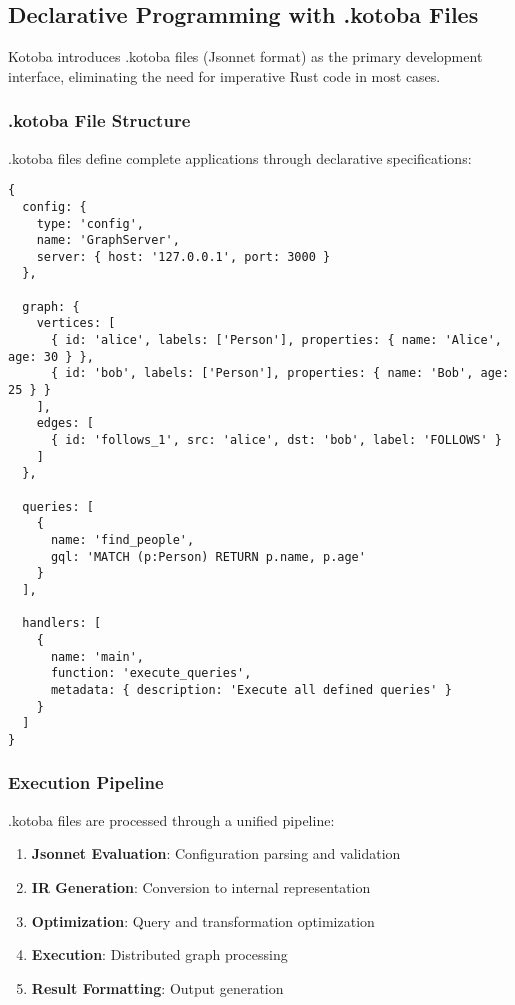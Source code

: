 \documentclass[11pt,a4paper]{article}
\begin{document}
\subsection{Declarative Programming with .kotoba Files}
\label{subsec:kotoba_files}

Kotoba introduces .kotoba files (Jsonnet format) as the primary development interface, eliminating the need for imperative Rust code in most cases.

\subsubsection{.kotoba File Structure}
\label{subsubsec:kotoba_structure}

.kotoba files define complete applications through declarative specifications:

\begin{lstlisting}[language=jsonnet,caption=Example .kotoba file for HTTP server]
{
  config: {
    type: 'config',
    name: 'GraphServer',
    server: { host: '127.0.0.1', port: 3000 }
  },

  graph: {
    vertices: [
      { id: 'alice', labels: ['Person'], properties: { name: 'Alice', age: 30 } },
      { id: 'bob', labels: ['Person'], properties: { name: 'Bob', age: 25 } }
    ],
    edges: [
      { id: 'follows_1', src: 'alice', dst: 'bob', label: 'FOLLOWS' }
    ]
  },

  queries: [
    {
      name: 'find_people',
      gql: 'MATCH (p:Person) RETURN p.name, p.age'
    }
  ],

  handlers: [
    {
      name: 'main',
      function: 'execute_queries',
      metadata: { description: 'Execute all defined queries' }
    }
  ]
}
\end{lstlisting}

\subsubsection{Execution Pipeline}
\label{subsubsec:execution_pipeline}

.kotoba files are processed through a unified pipeline:

\begin{enumerate}
\item \textbf{Jsonnet Evaluation}: Configuration parsing and validation
\item \textbf{IR Generation}: Conversion to internal representation
\item \textbf{Optimization}: Query and transformation optimization
\item \textbf{Execution}: Distributed graph processing
\item \textbf{Result Formatting}: Output generation
\end{enumerate}
\end{document}
